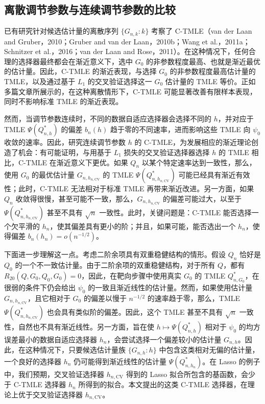 \subsection{离散调节参数与连续调节参数的比较}
\label{subsec:ch10-discrete-continuous}

已有研究针对候选估计量的离散序列 $\{G_{n,k}:k\}$ 考察了 C-TMLE（van der Laan and Gruber，2010；Gruber and van der Laan，2010b；Wang et al.，2011a；Schnitzer et al.，2016；van der Laan and Rose，2011）。在这种情况下，任何合理的选择器最终都会在渐近意义下，选中 $G_0$ 的非参数程度最高、也就是渐近最优的估计量。因此，C-TMLE 的渐近表现，与选择 $G_0$ 的非参数程度最高估计量的 TMLE，以及通过基于 $L_1$ 的交叉验证选择这一 $G_0$ 估计量的 TMLE 等价。正如多篇文章所展示的，在这种离散情形下，C-TMLE 可能显著改善有限样本表现，同时不影响标准 TMLE 的渐近表现。

然而，当调节参数连续时，不同的数据自适应选择器会选择不同的 $h$，并对应于 TMLE $\Psi(Q_{n,h}^*)$ 的偏差 $b_n(h)$ 趋于零的不同速率，进而影响这些 TMLE 向 $\psi_0$ 收敛的速率。因此，研究连续调节参数 $h$ 的 C-TMLE，为发展相应的渐近理论创造了机会：有可能证明，与用基于 $L_1$ 损失的交叉验证选择器选择 $h$ 的 TMLE 相比，C-TMLE 在渐近意义下更优。如果 $Q_n$ 以某个特定速率达到一致性，那么，使用 $G_0$ 的最优估计量 $G_{n,h_{n,\mathrm{CV}}}$ 的 TMLE
$\Psi(Q_{n,h_{n,\mathrm{CV}}}^*)$
可能已经具有渐近有效性；此时，C-TMLE 无法相对于标准 TMLE 再带来渐近改进。另一方面，如果 $Q_n$ 收敛得很慢，甚至可能不一致，那么，$G_{n,h_{n,\mathrm{CV}}}$ 的偏差可能过大，以至于 $\Psi(Q_{n,h_{n,\mathrm{CV}}}^*)$ 甚至不具有 $\sqrt n$ 一致性。此时，关键问题是：C-TMLE 能否选择一个欠平滑的 $h_n$，使其偏差具有更小的阶；并且，如果可能，能否选出一个 $h_n$，使得偏差 $b_n(h_n)=o(n^{-1/2})$。

下面进一步理解这一点。考虑二阶余项具有双重稳健结构的情形。假设 $Q_n$ 恰好是 $Q_0$ 的一个不一致估计量。由于二阶余项的双重稳健结构，对于所有 $Q$，都有 $R_{20}(Q,G_0,Q_0,G_0)=0$，因此，在靶向步骤中使用真实 $G_0$ 的 TMLE $Q_{n,G_0}^*$，在很弱的条件下仍会给出 $\psi_0$ 的一致且渐近线性的估计量。然而，如果使用估计量 $G_{n,h_{n,\mathrm{CV}}}$，且它相对于 $G_0$ 的偏差以慢于 $n^{-1/2}$ 的速率趋于零，那么，TMLE $\Psi(Q_{n,h_{n,\mathrm{CV}}}^*)$ 也会具有类似阶的偏差。因此，这个 TMLE 甚至不具有 $\sqrt n$ 一致性，自然也不具有渐近线性。另一方面，旨在使 $h\mapsto\Psi(Q_{n,h}^*)$ 相对于 $\psi_0$ 的均方误差最小的数据自适应选择器 $h_n$，会尝试选择一个偏差较小的估计量 $G_{n,h}$。因此，在这种情况下，只要候选估计量族 $\{G_{n,h}:h\}$ 中包含这类相对无偏的估计量，一个良好的选择器 $h_n$ 仍可能得到渐近线性的估计量 $\Psi(Q_{n,h_n}^*)$。在 Lasso 的例子中，我们预期，交叉验证选择器 $h_{n,\mathrm{CV}}$ 得到的 Lasso 拟合所包含的基函数，会少于 C-TMLE 选择器 $h_n$ 所得到的拟合。本文提出的这类 C-TMLE 选择器，在理论上优于交叉验证选择器 $h_{n,\mathrm{CV}}$。

